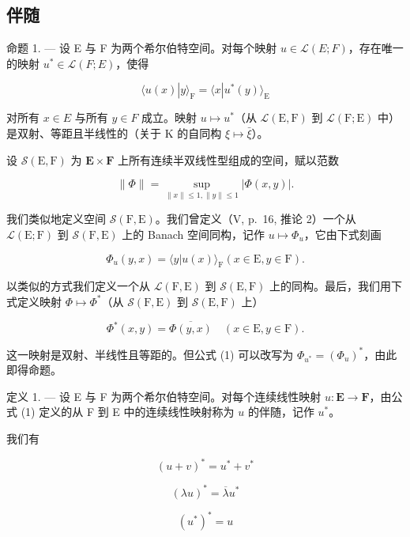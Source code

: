 \subsection{伴随}

命题 1. --- 设 E 与 F 为两个希尔伯特空间。对每个映射 \(u \in \mathcal{L}(E; F)\)，存在唯一的映射 \(u^{*} \in \mathcal{L}(F; E)\)，使得

\[
\langle u (x) | y \rangle_ {\mathrm{F}} = \langle x | u ^ {*} (y) \rangle_ {\mathrm{E}}\tag{1}
\]

对所有 \(x \in E\) 与所有 \(y \in F\) 成立。映射 \(u \mapsto u^{*}\)（从 \(\mathcal{L}(\mathrm{E}, \mathrm{F})\) 到 \(\mathcal{L}(\mathrm{F}; \mathrm{E})\) 中）是双射、等距且半线性的（关于 K 的自同构 \(\xi \mapsto \bar{\xi}\)）。

设 \(\mathcal{S}(\mathrm{E},\mathrm{F})\) 为 \(\mathbf{E}\times \mathbf{F}\) 上所有连续半双线性型组成的空间，赋以范数

\[
\| \Phi \| = \sup _ {\| x \| \leqslant 1, \| y \| \leqslant 1} | \Phi (x, y) |.\tag{2}
\]

我们类似地定义空间 \(\mathcal{S}(\mathrm{F},\mathrm{E})\)。我们曾定义（V, p.~16, 推论 2）一个从 \(\mathcal{L}(\mathrm{E};\mathrm{F})\) 到 \(\mathcal{S}(\mathrm{F},\mathrm{E})\) 上的 Banach 空间同构，记作 \(u\mapsto\Phi_{u}\)，它由下式刻画

\[
\Phi_ {u} (y, x) = \langle y | u (x) \rangle_ {\mathrm{F}} (x \in \mathrm{E}, y \in \mathrm{F}).\tag{3}
\]

以类似的方式我们定义一个从 \(\mathcal{L}(\mathrm{F},\mathrm{E})\) 到 \(\mathcal{S}(\mathrm{E},\mathrm{F})\) 上的同构。最后，我们用下式定义映射 \(\Phi \mapsto \Phi^{*}\)（从 \(\mathcal{S}(\mathrm{F},\mathrm{E})\) 到 \(\mathcal{S}(\mathrm{E},\mathrm{F})\) 上）

\[
\Phi^ {*} (x, y) = \overline {{\Phi (y , x)}} \quad (x \in \mathrm{E}, y \in \mathrm{F}).\tag{4}
\]

这一映射是双射、半线性且等距的。但公式 (1) 可以改写为 \(\Phi_{u^{*}} = (\Phi_{u})^{*}\)，由此即得命题。

定义 1. --- 设 E 与 F 为两个希尔伯特空间。对每个连续线性映射 \(u: \mathbf{E} \to \mathbf{F}\)，由公式 (1) 定义的从 F 到 E 中的连续线性映射称为 \(u\) 的伴随，记作 \(u^*\)。

我们有

\[
(u + v) ^ {*} = u ^ {*} + v ^ {*}\tag{5}
\]

\[
(\lambda u) ^ {*} = \overline {{{{\lambda}}}} u ^ {*}\tag{6}
\]

\[
(u ^ {*}) ^ {*} = u\tag{7}
\]

